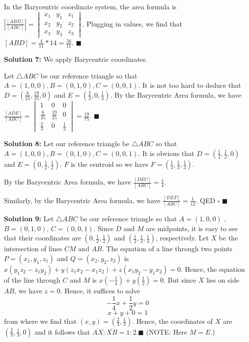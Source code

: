 \documentclass{article}
\begin{document}
In the Barycentric coordinate system, the area formula is $|\frac{[ABD]}{[ABC]}|=\begin{vmatrix}
x_{1} &y_{1}  &z_{1} \\ 
x_{2} &y_{2}  &z_{2} \\ 
 x_{3}& y_{3} & z_{3}
\end{vmatrix}$. Plugging in values, we find that $[ABD]=\frac {4}{11}*14=\frac{56}{11}$. $\blacksquare$
\vspace{.2in}


\textbf{Solution 7:}
We apply Barycentric coordinates.

Let $\triangle ABC$ be our reference triangle so that $A=(1,0,0),B=(0,1,0),C=(0,0,1)$. It is not too hard to deduce that $D=(\frac{6}{25},\frac{19}{25},0)$ and $E=(\frac 23,0,\frac 13)$. By the Barycentric Area formula, we have $\frac{[ADE]}{[ABC]}=\begin{vmatrix}
1 &0 &0 \\
\frac{6}{25} &\frac {19}{25} &0 \\
\frac 23& 0&\frac 13
\end{vmatrix} = \frac {19}{75}$. $\blacksquare$
\vspace{.2in}


\textbf{Solution 8:}
Let our reference triangle be $\triangle ABC$ so that $A=(1,0,0),B=(0,1,0),C=(0,0,1)$. It is obvious that $D=(\frac 12,\frac 12,0)$ and $E=(0,\frac 12,\frac 12)$. $F$ is the centroid so we have $F=(\frac 13,\frac 13,\frac 13)$.

By the Barycentric Area formula, we have $\frac{[DEC]}{[ABC]}=\frac 14$.

Similarly, by the Barycentric Area formula, we have $\frac{[DEF]}{[ABC]}=\frac {1}{12}$. QED $\square$ $\blacksquare$
\vspace{.2in}


\textbf{Solution 9:}
Let $\triangle ABC$ be our reference triangle so that $A=(1,0,0)$ , $B=(0,1,0)$, $C=(0,0,1)$. Since $D$ and $M$ are midpoints, it is easy to see that their coordinates are $(0,\frac 12,\frac 12)$ and $(\frac 12,\frac 14,\frac 14)$, respectively. Let $X$ be the intersection of lines $CM$ and $AB$. The equation of a line through two points $P=(x_1,y_1,z_1)$ and $Q=(x_2,y_2,z_2)$ is $x(y_1z_2 -z_1y_2)+y(z_1x_2-x_1z_2)+z(x_1y_2-y_1x_2)=0$. Hence, the equation of the line through $C$ and $M$ is $x(-\frac 14)+y(\frac 12)=0$. But since $X$ lies on side $AB$, we have $z=0$. Hence, it suffices to solve$$-\frac 14x+\frac 12 y=0$$$$x+y+0=1$$from where we find that $(x,y)=(\frac 23,\frac 13)$. Hence, the coordinates of $X$ are $(\frac 23,\frac 13,0)$ and it follows that $\overline{AX}:\overline{XB}=1:2. \blacksquare$
(NOTE: Here $M=E$.)
\vspace{.2in}
\end{document}
